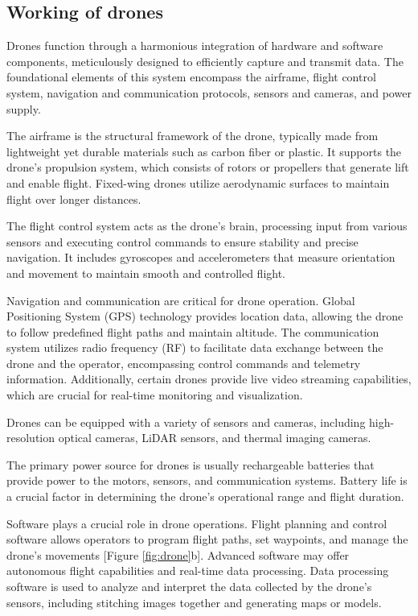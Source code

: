 \documentclass[
  12 pt,
]{Nemilov}
\begin{document}
\subsection{Working of drones}\label{working-of-drones}

Drones function through a harmonious integration of hardware and software components, meticulously designed to efficiently capture and transmit data. The foundational elements of this system encompass the airframe, flight control system, navigation and communication protocols, sensors and cameras, and power supply.

The airframe is the structural framework of the drone, typically made from lightweight yet durable materials such as carbon fiber or plastic. It supports the drone's propulsion system, which consists of rotors or propellers that generate lift and enable flight. Fixed-wing drones utilize aerodynamic surfaces to maintain flight over longer distances.

The flight control system acts as the drone's brain, processing input from various sensors and executing control commands to ensure stability and precise navigation. It includes gyroscopes and accelerometers that measure orientation and movement to maintain smooth and controlled flight.

Navigation and communication are critical for drone operation. Global Positioning System (GPS) technology provides location data, allowing the drone to follow predefined flight paths and maintain altitude. The communication system utilizes radio frequency (RF) to facilitate data exchange between the drone and the operator, encompassing control commands and telemetry information. Additionally, certain drones provide live video streaming capabilities, which are crucial for real-time monitoring and visualization.

Drones can be equipped with a variety of sensors and cameras, including high-resolution optical cameras, LiDAR sensors, and thermal imaging cameras.

The primary power source for drones is usually rechargeable batteries that provide power to the motors, sensors, and communication systems. Battery life is a crucial factor in determining the drone's operational range and flight duration.

Software plays a crucial role in drone operations. Flight planning and control software allows operators to program flight paths, set waypoints, and manage the drone's movements {[}Figure \ref{fig:drone}b{]}. Advanced software may offer autonomous flight capabilities and real-time data processing. Data processing software is used to analyze and interpret the data collected by the drone's sensors, including stitching images together and generating maps or models.
\end{document}
